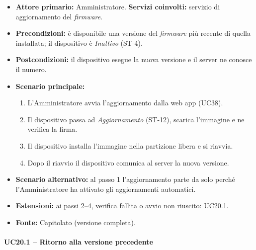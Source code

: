 \documentclass[12pt,a4paper]{article}
\newcommand{\tightlist}{\setlength{\itemsep}{1pt}\setlength{\parskip}{0pt}}
\begin{document}
\begin{itemize}

\tightlist

\item \textbf{Attore primario:} Amministratore. \textbf{Servizi coinvolti:} servizio di aggiornamento del \emph{firmware}.

\item \textbf{Precondizioni:} è disponibile una versione del \emph{firmware} più recente di quella installata; il dispositivo è \emph{Inattivo} (ST-4).

\item \textbf{Postcondizioni:} il dispositivo esegue la nuova versione e il server ne conosce il numero.

\item \textbf{Scenario principale:}

\begin{enumerate}

\tightlist

\item L'Amministratore avvia l'aggiornamento dalla web app (UC38).

\item Il dispositivo passa ad \emph{Aggiornamento} (ST-12), scarica l'immagine e ne verifica la firma.

\item Il dispositivo installa l'immagine nella partizione libera e si riavvia.

\item Dopo il riavvio il dispositivo comunica al server la nuova versione.

\end{enumerate}

\item \textbf{Scenario alternativo:} al passo 1 l'aggiornamento parte da solo perché l'Amministratore ha attivato gli aggiornamenti automatici.

\item \textbf{Estensioni:} ai passi 2--4, verifica fallita o avvio non riuscito: UC20.1.

\item \textbf{Fonte:} Capitolato (versione completa).

\end{itemize}



\paragraph{UC20.1 -- Ritorno alla versione precedente}
\end{document}
